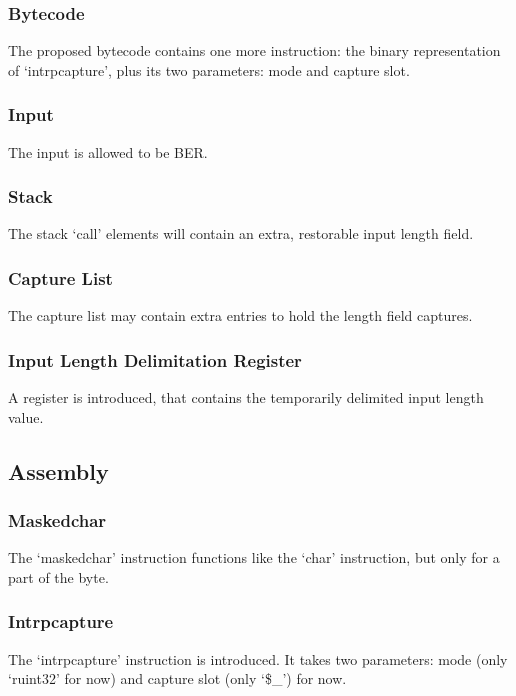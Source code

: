 \subsubsection{Bytecode}

The proposed bytecode contains one more instruction: the binary 
representation of ‘intrpcapture’, plus its two parameters: mode and 
capture slot.

\subsubsection{Input}

The input is allowed to be BER.

\subsubsection{Stack}

The stack ‘call’ elements will contain an extra, restorable input 
length field.

\subsubsection{Capture List}

The capture list may contain extra entries to hold the length field 
captures.

\subsubsection{Input Length Delimitation Register}
A register is introduced, that contains the temporarily delimited input 
length value.

\subsection{Assembly}

\subsubsection{Maskedchar}

The ‘maskedchar’ instruction functions like the ‘char’ 
instruction, but only for a part of the byte.

\subsubsection{Intrpcapture}

The ‘intrpcapture’ instruction is introduced. It takes two parameters: 
mode (only ‘ruint32’ for now) and capture slot (only ‘\$\_’) for now.

